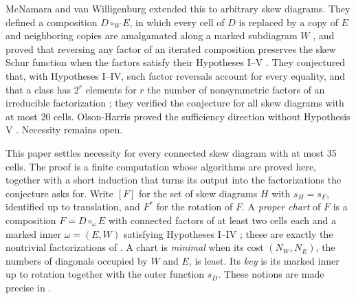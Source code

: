 \documentclass[11pt,a4paper]{amsart}
\numberwithin{equation}{section}
\theoremstyle{plain}
\theoremstyle{definition}
\begin{document}
McNamara and van Willigenburg extended this to arbitrary skew diagrams.  They defined a composition \(D\circ_W E\), in which every cell of \(D\) is replaced by a copy of \(E\) and neighboring copies are amalgamated along a marked subdiagram \(W\) \cite[Def.~3.11]{McNamara2009Classification}, and proved that reversing any factor of an iterated composition preserves the skew Schur function when the factors satisfy their Hypotheses I--V \cite[Thm.~5.3]{McNamara2009Classification}.  They conjectured that, with Hypotheses I--IV, such factor reversals account for every equality, and that a class has \(2^r\) elements for \(r\) the number of nonsymmetric factors of an irreducible factorization \cite[Conj.~5.7]{McNamara2009Classification}; they verified the conjecture for all skew diagrams with at most 20 cells.  Olson-Harris proved the sufficiency direction without Hypothesis V \cite[Thms.~5.3.9 and~5.3.10]{OlsonHarris2024HopfApplications}.  Necessity remains open.

This paper settles necessity for every connected skew diagram with at most 35 cells.  The proof is a finite computation whose algorithms are proved here, together with a short induction that turns its output into the factorizations the conjecture asks for.  Write \([F]\) for the set of skew diagrams \(H\) with \(s_H=s_F\), identified up to translation, and \(F^*\) for the rotation of \(F\).  A \emph{proper chart} of \(F\) is a composition \(F=D\circ_\omega E\) with connected factors of at least two cells each and a marked inner \(\omega=(E,W)\) satisfying Hypotheses I--IV \cite{Shields2026Gluing}; these are exactly the nontrivial factorizations of \cite[Def.~5.5]{McNamara2009Classification}.  A chart is \emph{minimal} when its cost \((N_W,N_E)\), the numbers of diagonals occupied by \(W\) and \(E\), is least.  Its \emph{key} is its marked inner up to rotation together with the outer function \(s_D\).  These notions are made precise in .
\end{document}

